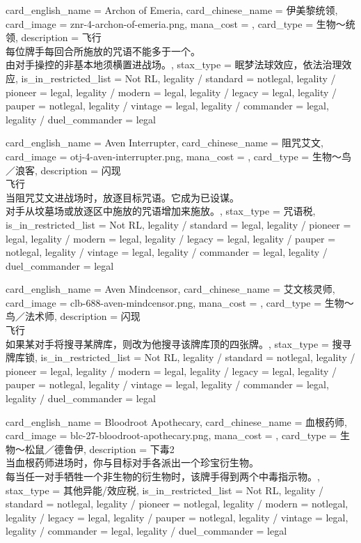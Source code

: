 \documentclass[lang = cn, color = black, 10pt]{AllThatStax}
\begin{document}
\card
{
	card_english_name = {Archon of Emeria},
	card_chinese_name = {伊美黎统领},
	card_image = znr-4-archon-of-emeria.png,
	mana_cost = ,
	card_type = 生物～统领,
	description = {飞行\\
每位牌手每回合所施放的咒语不能多于一个。\\
由对手操控的非基本地须横置进战场。},
	stax_type = 眠梦法球效应，依法治理效应,
	is_in_restricted_list = Not RL,
	legality / standard = notlegal,
	legality / pioneer = legal,
	legality / modern = legal,
	legality / legacy = legal,
	legality / pauper = notlegal,
	legality / vintage = legal,
	legality / commander = legal,
	legality / duel_commander = legal
}

\card
{
	card_english_name = {Aven Interrupter},
	card_chinese_name = {阻咒艾文},
	card_image = otj-4-aven-interrupter.png,
	mana_cost = ,
	card_type = 生物～鸟／浪客,
	description = {闪现\\
飞行\\
当阻咒艾文进战场时，放逐目标咒语。它成为已设谋。\\
对手从坟墓场或放逐区中施放的咒语增加来施放。},
	stax_type = 咒语税,
	is_in_restricted_list = Not RL,
	legality / standard = legal,
	legality / pioneer = legal,
	legality / modern = legal,
	legality / legacy = legal,
	legality / pauper = notlegal,
	legality / vintage = legal,
	legality / commander = legal,
	legality / duel_commander = legal
}

\card
{
	card_english_name = {Aven Mindcensor},
	card_chinese_name = {艾文核灵师},
	card_image = clb-688-aven-mindcensor.png,
	mana_cost = ,
	card_type = 生物～鸟／法术师,
	description = {闪现\\
飞行\\
如果某对手将搜寻某牌库，则改为他搜寻该牌库顶的四张牌。},
	stax_type = 搜寻牌库锁,
	is_in_restricted_list = Not RL,
	legality / standard = notlegal,
	legality / pioneer = legal,
	legality / modern = legal,
	legality / legacy = legal,
	legality / pauper = notlegal,
	legality / vintage = legal,
	legality / commander = legal,
	legality / duel_commander = legal
}

\card
{
	card_english_name = {Bloodroot Apothecary},
	card_chinese_name = {血根药师},
	card_image = blc-27-bloodroot-apothecary.png,
	mana_cost = ,
	card_type = 生物～松鼠／德鲁伊,
	description = {下毒2\\
当血根药师进场时，你与目标对手各派出一个珍宝衍生物。\\
每当任一对手牺牲一个非生物的衍生物时，该牌手得到两个中毒指示物。},
	stax_type = 其他异能/效应税,
	is_in_restricted_list = Not RL,
	legality / standard = notlegal,
	legality / pioneer = notlegal,
	legality / modern = notlegal,
	legality / legacy = legal,
	legality / pauper = notlegal,
	legality / vintage = legal,
	legality / commander = legal,
	legality / duel_commander = legal
}
\end{document}
